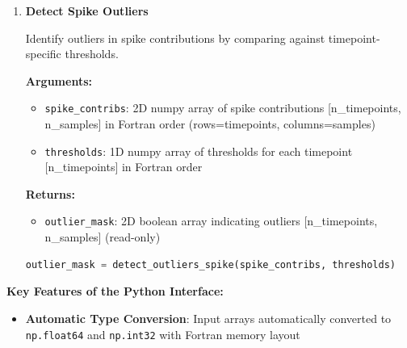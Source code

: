 \documentclass[11pt]{article}
\begin{document}
\begin{enumerate}
\begin{enumerate}
\begin{itemize}
	      	      	\item \texttt{percentile\_val}: Percentile value for threshold (0.0--100.0)
	      	      \end{itemize}
	      	      \textbf{Returns:}
	      	      \begin{itemize}
	      	      	\item \texttt{thresholds}: 1D numpy array of thresholds for each timepoint
	      	      	      [n\_timepoints] (read-only)
	      	      \end{itemize}
	      	      \begin{lstlisting}[language=Python, caption={Spike Thresholds Calculation}]
thresholds = calc_spike_thresholds(spike_contribs, percentile_val)
	      	      \end{lstlisting}
	      	      
	      	\item \textbf{Detect Spike Outliers}
	      	      
	      	      Identify outliers in spike contributions by comparing against timepoint-specific
	      	      thresholds.
	      	      
	      	      \textbf{Arguments:}
	      	      \begin{itemize}
	      	      	\item \texttt{spike\_contribs}: 2D numpy array of spike contributions
	      	      	      [n\_timepoints, n\_samples] in Fortran order (rows=timepoints,
	      	      	      columns=samples)
	      	      	      
	      	      	\item \texttt{thresholds}: 1D numpy array of thresholds for each timepoint
	      	      	      [n\_timepoints] in Fortran order
	      	      \end{itemize}
	      	      \textbf{Returns:}
	      	      \begin{itemize}
	      	      	\item \texttt{outlier\_mask}: 2D boolean array indicating outliers [n\_timepoints,
	      	      	n\_samples] (read-only)
	      	      \end{itemize}
	      	      \begin{lstlisting}[language=Python, caption={Spike Outlier Detection}]
outlier_mask = detect_outliers_spike(spike_contribs, thresholds)
	      	      \end{lstlisting}
	      \end{enumerate}
	      
	      \textbf{Key Features of the Python Interface:}
	      \begin{itemize}
	      	\item \textbf{Automatic Type Conversion}: Input arrays automatically converted
	      	      to \texttt{np.float64} and \texttt{np.int32} with Fortran memory layout
	      	      

\end{itemize}
\end{enumerate}
\end{document}

